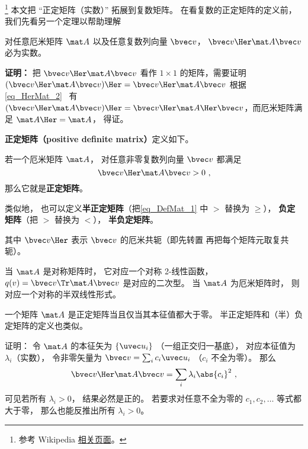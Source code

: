 


\footnote{参考 Wikipedia \href{https://en.wikipedia.org/wiki/Definite_matrix}{相关页面}。}
本文把 “正定矩阵（实数）” 拓展到复数矩阵。 在看复数的正定矩阵的定义前，我们先看另一个定理以帮助理解

\begin{theorem}{}
对任意厄米矩阵 $\mat A$ 以及任意复数列向量 $\bvec v$， $\bvec v\Her \mat A \bvec v$ 必为实数。
\end{theorem}
\textbf{证明：} 把 $\bvec v\Her \mat A \bvec v$ 看作 $1\times 1$ 的矩阵，需要证明 $(\bvec v\Her \mat A \bvec v)\Her = \bvec v\Her \mat A \bvec v$ 根据\autoref{eq_HerMat_2}~ 有 $(\bvec v\Her \mat A \bvec v)\Her = \bvec v\Her \mat A\Her \bvec v$，而厄米矩阵满足 $\mat A\Her=\mat A$， 得证。

\textbf{正定矩阵（positive definite matrix）}定义如下。
\begin{definition}{}
若一个厄米矩阵 $\mat A$， 对任意非零复数列向量 $\bvec v$ 都满足
\begin{equation}\label{eq_DefMat_1}
\bvec v\Her \mat A\bvec v > 0~,
\end{equation}
那么它就是\textbf{正定矩阵}。

类似地， 也可以定义\textbf{半正定矩阵}（把\autoref{eq_DefMat_1} 中 $>$ 替换为 $\geqslant$）， \textbf{负定矩阵}（把 $>$ 替换为 $<$）， \textbf{半负定矩阵}。
\end{definition}
其中 $\bvec v\Her$ 表示 $\bvec v$ 的厄米共轭（即先转置 再把每个矩阵元取复共轭）。

当 $\mat A$ 是对称矩阵时， 它对应一个对称 2-线性函数， $q(v) = \bvec v\Tr \mat A \bvec v$ 是对应的二次型。 当 $\mat A$ 为厄米矩阵时， 则对应一个对称的半双线性形式。

\begin{theorem}{}
一个矩阵 $\mat A$ 是正定矩阵当且仅当其本征值都大于零。 半正定矩阵和（半）负定矩阵的定义也类似。
\end{theorem}

证明： 令 $\mat A$ 的本征矢为 $\{\uvec u_i\}$ （一组正交归一基底）， 对应本征值为 $\lambda_i$（实数）， 令非零矢量为 $\bvec v = \sum_i c_i \uvec u_i$ （$c_i$ 不全为零）。 那么
\begin{equation}
\bvec v\Her \mat A \bvec v = \sum_i \lambda_i \abs{c_i}^2~,
\end{equation}
可见若所有 $\lambda_i > 0$， 结果必然是正的。 若要求对任意不全为零的 $c_1,c_2,\dots$ 等式都大于零， 那么也能反推出所有 $\lambda_i > 0$。

